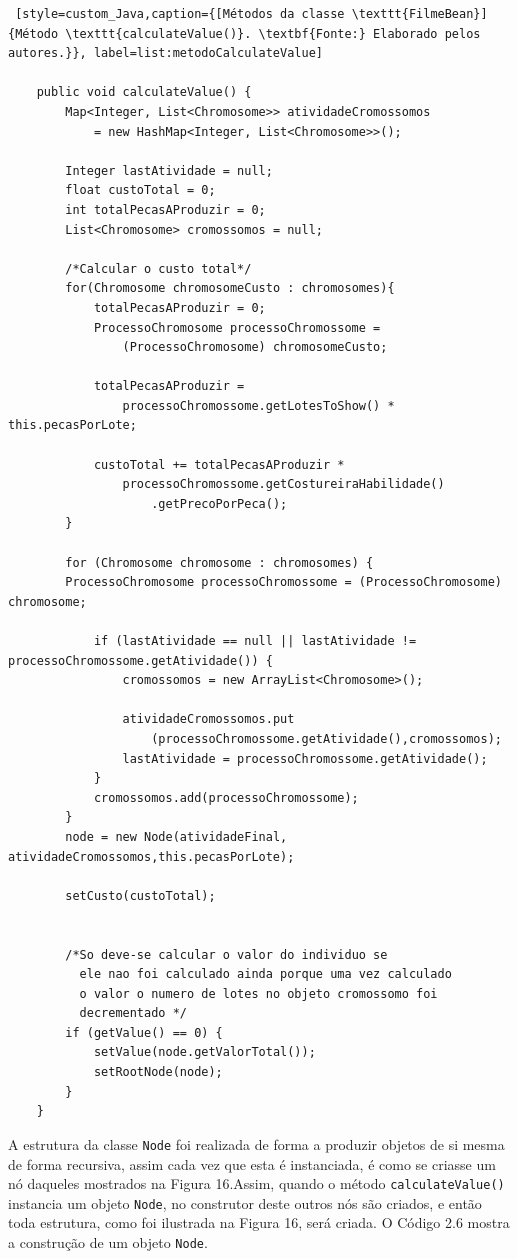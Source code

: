 \begin{lstlisting} [style=custom_Java,caption={[Métodos da classe \texttt{FilmeBean}]{Método \texttt{calculateValue()}. \textbf{Fonte:} Elaborado pelos autores.}}, label=list:metodoCalculateValue] 	

	public void calculateValue() {
		Map<Integer, List<Chromosome>> atividadeCromossomos 
			= new HashMap<Integer, List<Chromosome>>();
		
		Integer lastAtividade = null;
		float custoTotal = 0;
		int totalPecasAProduzir = 0;
		List<Chromosome> cromossomos = null;
		
		/*Calcular o custo total*/
		for(Chromosome chromosomeCusto : chromosomes){
			totalPecasAProduzir = 0;
			ProcessoChromosome processoChromossome = 
				(ProcessoChromosome) chromosomeCusto;
				
			totalPecasAProduzir = 
				processoChromossome.getLotesToShow() * this.pecasPorLote;
				
			custoTotal += totalPecasAProduzir * 
				processoChromossome.getCostureiraHabilidade()
					.getPrecoPorPeca();
		}
		
		for (Chromosome chromosome : chromosomes) {
		ProcessoChromosome processoChromossome = (ProcessoChromosome) chromosome;
		
			if (lastAtividade == null || lastAtividade != processoChromossome.getAtividade()) {
				cromossomos = new ArrayList<Chromosome>();
				
				atividadeCromossomos.put
					(processoChromossome.getAtividade(),cromossomos);
				lastAtividade = processoChromossome.getAtividade();
			}
			cromossomos.add(processoChromossome);
		}
		node = new Node(atividadeFinal, atividadeCromossomos,this.pecasPorLote);
		
		setCusto(custoTotal);
		
		
		/*So deve-se calcular o valor do individuo se 
		  ele nao foi calculado ainda porque uma vez calculado 
		  o valor o numero de lotes no objeto cromossomo foi 
		  decrementado */
		if (getValue() == 0) {
			setValue(node.getValorTotal());
			setRootNode(node);
		}
	}

\end{lstlisting}


\par A estrutura da classe \texttt{Node} foi realizada de forma a produzir objetos de si mesma de forma recursiva, assim 
cada vez que esta é instanciada, é como se criasse um nó daqueles
mostrados na Figura 16.Assim, quando o método \texttt{calculateValue()} instancia um objeto
\texttt{Node}, no construtor deste outros nós são criados, e então toda
estrutura, como foi ilustrada na Figura 16, será criada. O Código 2.6 mostra a construção de um objeto \texttt{Node}. 

